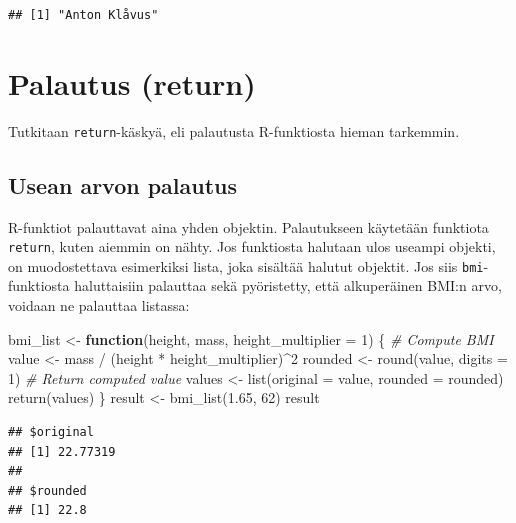 \documentclass[
]{book}
\newenvironment{Shaded}{\begin{snugshade}}{\end{snugshade}}
\newcommand{\AttributeTok}[1]{\textcolor[rgb]{0.77,0.63,0.00}{#1}}
\newcommand{\CommentTok}[1]{\textcolor[rgb]{0.56,0.35,0.01}{\textit{#1}}}
\newcommand{\ControlFlowTok}[1]{\textcolor[rgb]{0.13,0.29,0.53}{\textbf{#1}}}
\newcommand{\DecValTok}[1]{\textcolor[rgb]{0.00,0.00,0.81}{#1}}
\newcommand{\FloatTok}[1]{\textcolor[rgb]{0.00,0.00,0.81}{#1}}
\newcommand{\FunctionTok}[1]{\textcolor[rgb]{0.00,0.00,0.00}{#1}}
\newcommand{\NormalTok}[1]{#1}
\newcommand{\OtherTok}[1]{\textcolor[rgb]{0.56,0.35,0.01}{#1}}
\newcommand{\SpecialCharTok}[1]{\textcolor[rgb]{0.00,0.00,0.00}{#1}}
\begin{document}
\begin{verbatim}
## [1] "Anton Klåvus"
\end{verbatim}

\hypertarget{palautus-return}{%
\section{Palautus (return)}\label{palautus-return}}

Tutkitaan \texttt{return}-käskyä, eli palautusta R-funktiosta hieman tarkemmin.

\hypertarget{usean-arvon-palautus}{%
\subsection{Usean arvon palautus}\label{usean-arvon-palautus}}

R-funktiot palauttavat aina yhden objektin. Palautukseen käytetään funktiota \texttt{return}, kuten aiemmin on nähty. Jos funktiosta halutaan ulos useampi objekti, on muodostettava esimerkiksi lista, joka sisältää halutut objektit. Jos siis \texttt{bmi}-funktiosta haluttaisiin palauttaa sekä pyöristetty, että alkuperäinen BMI:n arvo, voidaan ne palauttaa listassa:

\begin{Shaded}
\begin{Highlighting}[]
\NormalTok{bmi\_list }\OtherTok{\textless{}{-}} \ControlFlowTok{function}\NormalTok{(height, mass, }\AttributeTok{height\_multiplier =} \DecValTok{1}\NormalTok{) \{}
  \CommentTok{\# Compute BMI}
\NormalTok{  value }\OtherTok{\textless{}{-}}\NormalTok{ mass }\SpecialCharTok{/}\NormalTok{ (height }\SpecialCharTok{*}\NormalTok{ height\_multiplier)}\SpecialCharTok{\^{}}\DecValTok{2}
\NormalTok{  rounded }\OtherTok{\textless{}{-}} \FunctionTok{round}\NormalTok{(value, }\AttributeTok{digits =} \DecValTok{1}\NormalTok{)}
  \CommentTok{\# Return computed value}
\NormalTok{  values }\OtherTok{\textless{}{-}} \FunctionTok{list}\NormalTok{(}\AttributeTok{original =}\NormalTok{ value,}
                 \AttributeTok{rounded =}\NormalTok{ rounded)}
  \FunctionTok{return}\NormalTok{(values)}
\NormalTok{\}}
\NormalTok{result }\OtherTok{\textless{}{-}} \FunctionTok{bmi\_list}\NormalTok{(}\FloatTok{1.65}\NormalTok{, }\DecValTok{62}\NormalTok{)}
\NormalTok{result}
\end{Highlighting}
\end{Shaded}

\begin{verbatim}
## $original
## [1] 22.77319
## 
## $rounded
## [1] 22.8
\end{verbatim}
\end{document}
